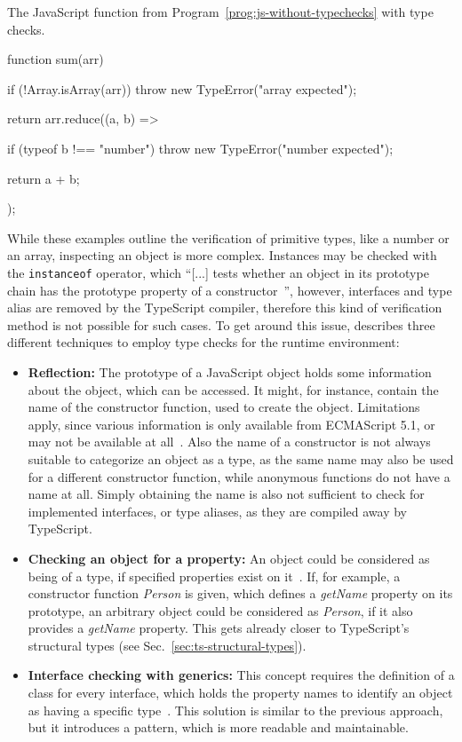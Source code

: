 \begin{program}
\caption{The JavaScript function from Program~\ref{prog:js-without-typechecks} with type checks.}
\label{prog:js-with-typechecks}
\begin{JsCode}
function sum(arr) {
  if (!Array.isArray(arr)) {
    throw new TypeError("array expected");
  }
  
  return arr.reduce((a, b) => {
    if (typeof b !== "number") {
      throw new TypeError("number expected");
    }
    
    return a + b;
  });
}
\end{JsCode}
\end{program}
While these examples outline the verification of primitive types, like a number or an array, inspecting an object is more complex. Instances may be checked with the \texttt{instanceof} operator, which ``[...] tests whether an object in its prototype chain has the prototype property of a constructor~\cite{instanceof:MDN:2017}'', however, interfaces and type alias are removed by the TypeScript compiler, therefore this kind of verification method is not possible for such cases. To get around this issue, \citeauthor{MasteringTypeScript:Rozentals:2015} describes three different techniques to employ type checks for the runtime environment:
\begin{itemize}
  \item \textbf{Reflection:} The prototype of a JavaScript object holds 
some information about the object, which can be accessed. It might, for instance, contain the name of the constructor function, used to create the object. Limitations apply, since various information is only available from ECMAScript 5.1, or may not be available at all~\cite[pp.~98--100]{MasteringTypeScript:Rozentals:2015}. Also the name of a constructor is not always suitable to categorize an object as a type, as the same name may also be used for a different constructor function, while anonymous functions do not have a name at all. Simply obtaining the name is also not sufficient to check for implemented interfaces, or type aliases, as they are compiled away by TypeScript.
  \item \textbf{Checking an object for a property:} An object could be considered 
as being of a type, if specified properties exist on it~\cites[pp.~101--102]{MasteringTypeScript:Rozentals:2015}[pp.~18--20]{ProJavaScriptDesignPatterns:HarmesDiaz:2008}. If, for example, a constructor function \emph{Person} is given, which defines a \emph{getName} property on its prototype, an arbitrary object could be considered as \emph{Person}, if it also provides a \emph{getName} property. This gets already closer to TypeScript's structural types (see Sec.~\ref{sec:ts-structural-types}).
  \item \textbf{Interface checking with generics:} This concept requires the definition of a class for every interface, which holds the property names to identify an object as having a specific type~\cites[pp.~102--105]{MasteringTypeScript:Rozentals:2015}[pp.~17--19]{ProJavaScriptDesignPatterns:HarmesDiaz:2008}. This solution is similar to the previous approach, but it introduces a pattern, which is more readable and maintainable.
\end{itemize}
